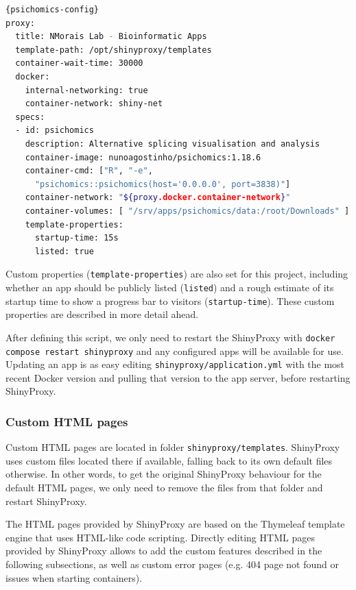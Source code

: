 \begin{lstlisting}[caption=Simplified ShinyProxy configuration with \texttt{psichomics}.,language=bash,label={lst:psichomics-config}]{psichomics-config}
proxy:
  title: NMorais Lab - Bioinformatic Apps
  template-path: /opt/shinyproxy/templates
  container-wait-time: 30000
  docker:
    internal-networking: true
    container-network: shiny-net
  specs:
  - id: psichomics
    description: Alternative splicing visualisation and analysis
    container-image: nunoagostinho/psichomics:1.18.6
    container-cmd: ["R", "-e",
      "psichomics::psichomics(host='0.0.0.0', port=3838)"]
    container-network: "${proxy.docker.container-network}"
    container-volumes: [ "/srv/apps/psichomics/data:/root/Downloads" ]
    template-properties:
      startup-time: 15s
      listed: true
\end{lstlisting}

Custom properties (\texttt{template-properties}) are also set for this project, including whether an app should be publicly listed (\texttt{listed}) and a rough estimate of its startup time to show a progress bar to visitors (\texttt{startup-time}). These custom properties are described in more detail ahead.

After defining this script, we only need to restart the ShinyProxy with \texttt{docker compose restart shinyproxy} and any configured apps will be available for use. Updating an app is as easy editing \texttt{shinyproxy/application.yml} with the most recent Docker version and pulling that version to the app server, before restarting ShinyProxy.

\subsubsection{Custom HTML pages}

Custom HTML pages are located in folder \texttt{shinyproxy/templates}. ShinyProxy uses custom files located there if available, falling back to its own default files otherwise. In other words, to get the original ShinyProxy behaviour for the default HTML pages, we only need to remove the files from that folder and restart ShinyProxy.

The HTML pages provided by ShinyProxy are based on the Thymeleaf template engine that uses HTML-like code scripting. Directly editing HTML pages provided by ShinyProxy allows to add the custom features described in the following subsections, as well as custom error pages (e.g. 404 page not found or issues when starting containers).

